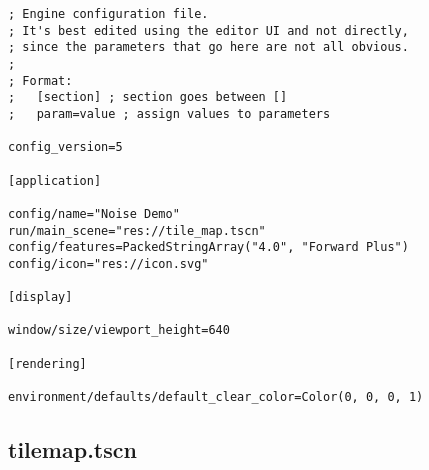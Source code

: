 \begin{lstlisting}
; Engine configuration file.
; It's best edited using the editor UI and not directly,
; since the parameters that go here are not all obvious.
;
; Format:
;   [section] ; section goes between []
;   param=value ; assign values to parameters

config_version=5

[application]

config/name="Noise Demo"
run/main_scene="res://tile_map.tscn"
config/features=PackedStringArray("4.0", "Forward Plus")
config/icon="res://icon.svg"

[display]

window/size/viewport_height=640

[rendering]

environment/defaults/default_clear_color=Color(0, 0, 0, 1)
\end{lstlisting}

\subsection{tile\textunderscore{}map.tscn}

